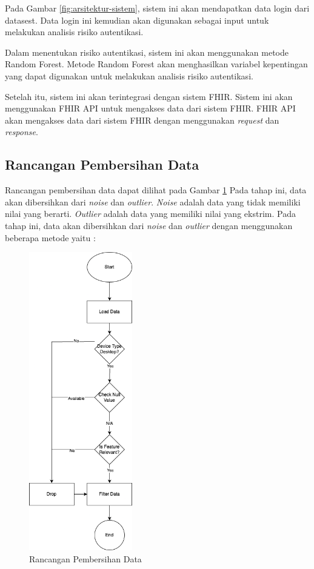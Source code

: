 Pada Gambar \ref{fig:arsitektur-sistem}, sistem ini akan mendapatkan data login dari datasest. Data login ini kemudian akan digunakan sebagai input untuk melakukan analisis risiko autentikasi.

Dalam menentukan risiko autentikasi, sistem ini akan menggunakan metode Random Forest. Metode Random Forest akan menghasilkan variabel kepentingan yang dapat digunakan untuk melakukan analisis risiko autentikasi.

Setelah itu, sistem ini akan terintegrasi dengan sistem FHIR. Sistem ini akan menggunakan FHIR API untuk mengakses data dari sistem FHIR. FHIR API akan mengakses data dari sistem FHIR dengan menggunakan \textit{request} dan \textit{response}.

\subsection{Rancangan Pembersihan Data}
Rancangan pembersihan data dapat dilihat pada Gambar \ref{fig:pembersihan-data} Pada tahap ini, data akan dibersihkan dari \textit{noise} dan \textit{outlier}. \textit{Noise} adalah data yang tidak memiliki nilai yang berarti. \textit{Outlier} adalah data yang memiliki nilai yang ekstrim. Pada tahap ini, data akan dibersihkan dari \textit{noise} dan \textit{outlier} dengan menggunakan beberapa metode yaitu :

\begin{figure}[H]
    \centering
    \includegraphics[width=0.4\textwidth]{contents/chapter-4/pre-processing.png}
    \caption{Rancangan Pembersihan Data}
    \label{fig:pembersihan-data}
\end{figure}

